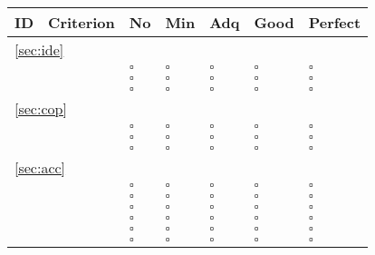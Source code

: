 \documentclass[a4paper,11pt]{article}
\begin{document}
\begin{table}[hbt]
	\begin{tabular}
		{ p{} | 
		  p{} |
		  p{} |
		  p{} |
		  p{} |
		  p{} |
		  p{} }
		\hline
		\textbf{ID} & \textbf{Criterion} & \textbf{No} & \textbf{Min} & \textbf{Adq} & \textbf{Good} & \textbf{Perfect} \\
		\hline
		\multicolumn{7}{l}{\ref{sec:ide}{ }\nameref{sec:ide}} \\
		\hline
		\hyperref[id:id1]{\idOneID} & \idOneText & $\square$ & $\square$ & $\square$ & $\square$ & $\square$ \\
		\hyperref[id:id2]{\idTwoID} & \idTwoText & $\square$ & $\square$ & $\square$ & $\square$ & $\square$ \\
		\hyperref[id:id3]{\idThreeID} & \idThreeText & $\square$ & $\square$ & $\square$ & $\square$ & $\square$ \\
		\hline
		\multicolumn{7}{l}{\ref{sec:cop}{ }\nameref{sec:cop}} \\
		\hline
		\hyperref[id:cp1]{\cpOneID} & \cpOneText & $\square$ & $\square$ & $\square$ & $\square$ & $\square$ \\
		\hyperref[id:cp2]{\cpTwoID} & \cpTwoText & $\square$ & $\square$ & $\square$ & $\square$ & $\square$ \\
		\hyperref[id:cp3]{\cpThreeID} & \cpThreeText & $\square$ & $\square$ & $\square$ & $\square$ & $\square$ \\
		\hline
		\multicolumn{7}{l}{\ref{sec:acc}{ }\nameref{sec:acc}} \\
		\hline
		\hyperref[id:ac1]{\acOneID} & \acOneText & $\square$ & $\square$ & $\square$ & $\square$ & $\square$ \\
		\hyperref[id:ac2]{\acTwoID} & \acTwoText & $\square$ & $\square$ & $\square$ & $\square$ & $\square$ \\
		\hyperref[id:ac3]{\acThreeID} & \acThreeText & $\square$ & $\square$ & $\square$ & $\square$ & $\square$ \\
		\hyperref[id:ac4]{\acFourID} & \acFourText & $\square$ & $\square$ & $\square$ & $\square$ & $\square$ \\
		\hyperref[id:ac5]{\acFiveID} & \acFiveText & $\square$ & $\square$ & $\square$ & $\square$ & $\square$ \\
		\hyperref[id:ac6]{\acSixID} & \acSixText & $\square$ & $\square$ & $\square$ & $\square$ & $\square$ \\

\end{tabular}
\end{table}
\end{document}
